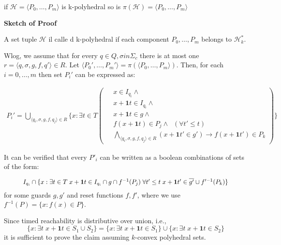 \documentclass[table]{beamer}
\begin{document}
\begin{frame}
	\begin{thm}
		if $\mathcal{H} = \langle P_0, \ldots, P_m\rangle$ is k-polyhedral so is $\pi(\mathcal{H}) = \langle P_0, \ldots, P_m\rangle$
	\end{thm}
\end{frame}

\begin{frame}
	\textbf{Sketch of Proof}
	
	\medskip

	A set tuple $\mathcal{H}$ il calle d k-polyhedral if each component $P_0,\ldots,P_m$ belongs to $\mathcal{H}^*_k$.

	Wlog, we assume that for every $q \in Q,\sigma in \Sigma_c$ there is at most one $r=\langle q,\sigma,g,f,q'\rangle \in R$. Let $\langle P_0', \ldots, P_m'\rangle = \pi(\langle P_0, \ldots, P_m\rangle)$. Then, for each $i=0,\ldots,m$ then set $P_i'$ can be expressed as:

	\noindent 
	\begin{adjustbox}{max width=\textwidth}
	\parbox{\linewidth}{%
		\begin{align*}
			P_i' = \bigcup_{\langle q_i,\sigma,g,f,q_j\rangle \in R} \{x : \exists t \in T \left (
			\begin{aligned}
				\;&x \in I_{q_i} \land\\
				\;&x+\textbf{1}t \in I_{q_i} \land\\ 
				\;&x+\textbf{1}t \in g \land\\
				\;&f(x+\textbf{1}t) \in P_j \land \;\; (\forall t' \leq t)\\
				\;&\bigwedge_{\langle q_i,\sigma,g,f,q_j\rangle \in R}(x+\textbf{1}t' \in g')\rightarrow f(x+\textbf{1}t')\in P_k
			\end{aligned} \right ) \}
		\end{align*}
	}
	\end{adjustbox}
\end{frame}

\begin{frame}
	It can be verified that every $P'_i$ can be written as a boolean combinations of sets of the form:

	\begin{equation*}
		\resizebox{.9\hsize}{!}{
			$I_{q_i} \cap \{x : \exists t \in T \;  x+\textbf{1}t \in I_{q_i} \cap g \cap f^{-1}(P_j)\; \forall t' \leq t \; x+\textbf{1}t' \in \overline{g'} \cup f'^{-1}(P_k)\}$
		}
	\end{equation*}
	for some guards $g,g'$ and reset functions $f,f'$, where we use $f^{-1}(P)=\{x : f(x) \in P\}$.

	\medskip
	
	Since timed reachability is distributive over union, i.e.,
	$$\{x:\exists t\;x+\textbf{1}t \in S_1 \cup S_2\} = \{x:\exists t\;x+\textbf{1}t \in S_1\} \cup \{x:\exists t\;x+\textbf{1}t \in S_2\}$$
	it is sufficient to prove the claim assuming $k$-convex polyhedral sets.

\end{frame}
\end{document}
